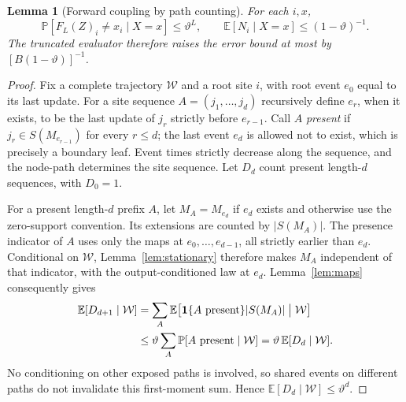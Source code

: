 \documentclass[11pt]{article}
\newtheorem{lemma}[theorem]{Lemma}
\theoremstyle{definition}\newtheorem{definition}[theorem]{Definition}
\theoremstyle{remark}\newtheorem{remark}[theorem]{Remark}
\newcommand{\E}{\mathbb E}\newcommand{\Prb}{\mathbb P}
\begin{document}
\begin{lemma}[Forward coupling by path counting]\label{lem:discrepancy}
For each \(i,x\),
\[
 \Prb[F_L(Z)_i\ne x_i\mid X=x]\le\vartheta^L,\qquad
 \E[N_i\mid X=x]\le(1-\vartheta)^{-1}.
\]
The truncated evaluator therefore raises the error bound at most by \([B(1-\vartheta)]^{-1}\).
\end{lemma}
\begin{proof}
Fix a complete trajectory \(\mathcal W\) and a root site \(i\), with root event \(e_0\) equal to its last update. For a site sequence \(A=(j_1,\ldots,j_d)\) recursively define \(e_r\), when it exists, to be the last update of \(j_r\) strictly before \(e_{r-1}\). Call \(A\) \emph{present} if \(j_r\in S(M_{e_{r-1}})\) for every \(r\le d\); the last event \(e_d\) is allowed not to exist, which is precisely a boundary leaf. Event times strictly decrease along the sequence, and the node-path determines the site sequence. Let \(D_d\) count present length-\(d\) sequences, with \(D_0=1\).

For a present length-\(d\) prefix \(A\), let \(M_A=M_{e_d}\) if \(e_d\) exists and otherwise use the zero-support convention. Its extensions are counted by \(|S(M_A)|\). The presence indicator of \(A\) uses only the maps at \(e_0,\ldots,e_{d-1}\), all strictly earlier than \(e_d\). Conditional on \(\mathcal W\), Lemma~\ref{lem:stationary} therefore makes \(M_A\) independent of that indicator, with the output-conditioned law at \(e_d\). Lemma~\ref{lem:maps} consequently gives
\begin{align*}
 \E[D_{d+1}\mid\mathcal W]&=\sum_A\E\bigl[\mathbf 1\{A\text{ present}\}|S(M_A)|\bigm|\mathcal W\bigr]\\
 &\le\vartheta\sum_A\Prb[A\text{ present}\mid\mathcal W]=\vartheta\,\E[D_d\mid\mathcal W].
\end{align*}
No conditioning on other exposed paths is involved, so shared events on different paths do not invalidate this first-moment sum. Hence \(\E[D_d\mid\mathcal W]\le\vartheta^d\).


\end{proof}
\end{document}

